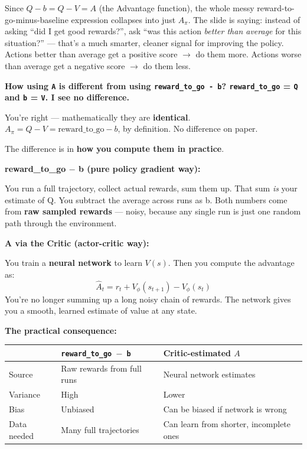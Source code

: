 Since $Q - b = Q - V = A$ (the Advantage function), the whole messy reward-to-go-minus-baseline expression collapses into just $A_\pi$. The slide is saying: instead of asking ``did I get good rewards?'', ask ``was this action \textit{better than average} for this situation?'' --- that's a much smarter, cleaner signal for improving the policy. Actions better than average get a positive score $\to$ do them more. Actions worse than average get a negative score $\to$ do them less.

\bigskip


\textbf{How using \texttt{A} is different from using \texttt{reward\_to\_go - b}? \texttt{reward\_to\_go} = \texttt{Q} and \texttt{b} = \texttt{V}. I see no difference.}

\medskip

You're right --- mathematically they are \textbf{identical}. $A_\pi = Q - V = \text{reward\_to\_go} - b$, by definition. No difference on paper.

The difference is in \textbf{how you compute them in practice}.

\medskip

\textbf{reward\_to\_go $-$ b (pure policy gradient way):}

You run a full trajectory, collect actual rewards, sum them up. That sum \textit{is} your estimate of Q. You subtract the average across runs as b. Both numbers come from \textbf{raw sampled rewards} --- noisy, because any single run is just one random path through the environment.

\medskip

\textbf{A via the Critic (actor-critic way):}

You train a \textbf{neural network} to learn $V(s)$. Then you compute the advantage as:
\[
\hat{A}_t = r_t + V_\phi(s_{t+1}) - V_\phi(s_t)
\]
You're no longer summing up a long noisy chain of rewards. The network gives you a smooth, learned estimate of value at any state.

\medskip

\textbf{The practical consequence:}

\begin{center}
\begin{tabular}{lll}
\hline
 & \texttt{reward\_to\_go $-$ b} & Critic-estimated $A$ \\
\hline
Source        & Raw rewards from full runs     & Neural network estimates \\
Variance      & High                           & Lower \\
Bias          & Unbiased                       & Can be biased if network is wrong \\
Data needed   & Many full trajectories         & Can learn from shorter, incomplete ones \\
\hline
\end{tabular}
\end{center}

